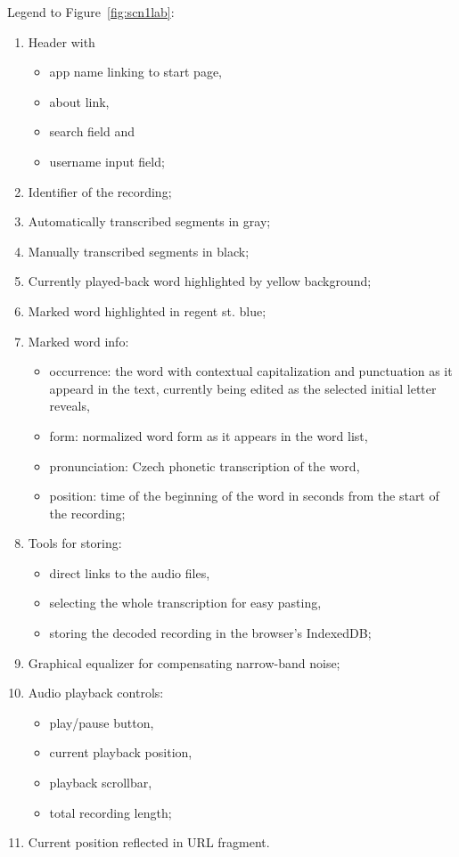 \documentclass{svproc}
\begin{document}
Legend to Figure~\ref{fig:scn1lab}:
\begin{enumerate}
\item{
    Header with
    \begin{itemize}
    \item{app name linking to start page,}
    \item{about link,}
    \item{search field and}
    \item{username input field;}
    \end{itemize}
}
\item{Identifier of the recording;}
\item{Automatically transcribed segments in gray;}
\item{Manually transcribed segments in black;}
\item{Currently played-back word highlighted by yellow background;}
\item{Marked word highlighted in regent st. blue;}
\item{
    Marked word info:
    \begin{itemize}
    \item{
        occurrence: the word with contextual capitalization and
        punctuation as it appeard in the text, currently being edited as the
        selected initial letter reveals,
    }
    \item{form: normalized word form as it appears in the word list,}
    \item{pronunciation: Czech phonetic transcription of the word,}
    \item{
        position: time of the beginning of the word in seconds from the
        start of the recording;
    }
    \end{itemize}
}
\item{
    Tools for storing:
    \begin{itemize}
    \item{direct links to the audio files,}
    \item{selecting the whole transcription for easy pasting,}
    \item{storing the decoded recording in the browser's IndexedDB;}
    \end{itemize}
}
\item{Graphical equalizer for compensating narrow-band noise;}
\item{
    Audio playback controls:
    \begin{itemize}
    \item{play/pause button,}
    \item{current playback position,}
    \item{playback scrollbar,}
    \item{total recording length;}
    \end{itemize}
}
\item{Current position reflected in URL fragment.}
\end{enumerate}
\end{document}
